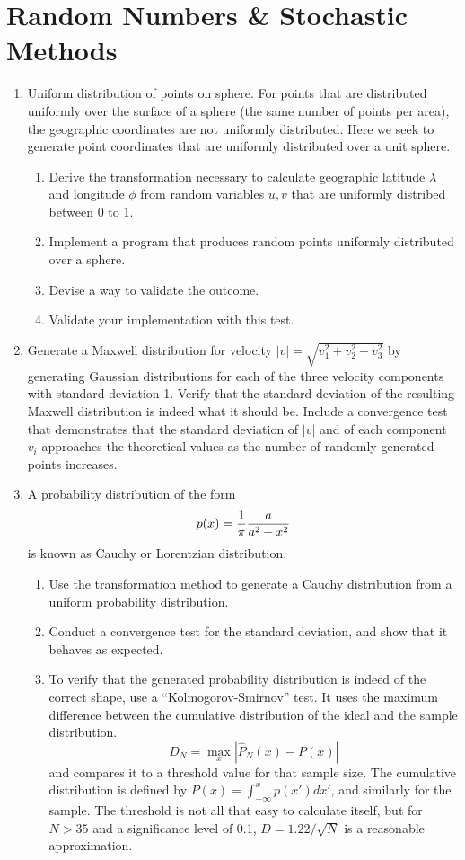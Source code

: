 \documentclass{article}
\begin{document}
\newpage
\section{Random Numbers \& Stochastic Methods}
\begin{enumerate}
\item
Uniform distribution of points on sphere.
For points that are distributed uniformly over the surface of a sphere (the same number of points per area), the geographic coordinates are not uniformly distributed. Here we seek to generate point coordinates that are uniformly distributed over a unit sphere.
\begin{enumerate} \setlength{\itemsep}{0pt}
\item Derive the transformation necessary to calculate geographic latitude $\lambda$ and longitude $\phi$ from random variables $u, v$ that are uniformly distribed between 0 to 1.
\item Implement a program that produces random points uniformly distributed over a sphere.
\item Devise a way to validate the outcome.
\item Validate your implementation with this test.
\end{enumerate}

\item
Generate a Maxwell distribution for velocity $|v|=\sqrt{v_1^2+v_2^2+v_3^2}$ by generating Gaussian distributions for each of the three velocity components with standard deviation 1. Verify that the standard deviation of the resulting Maxwell distribution is indeed what it should be. Include a convergence test that demonstrates that the standard deviation of $|v|$ and of each component $v_i$ approaches the theoretical values as the number of randomly generated points increases.


\item
  A probability distribution of the form
  \[
  p(x) = \frac{1}{\pi} {a \over a^2+x^2}
  \]
  is known as Cauchy or Lorentzian distribution.
  \begin{enumerate} \setlength{\itemsep}{0pt}
  \item Use the transformation method to generate a Cauchy distribution from a uniform probability distribution.
  \item Conduct a convergence test for the standard deviation, and show that it behaves as expected.
  \item To verify that the generated probability distribution is indeed of the correct shape, use a ``Kolmogorov-Smirnov'' test.  It uses the maximum difference between the cumulative distribution of the ideal and the sample distribution.
    \[
    D_N = \max_x |\hat P_N(x) - P(x) |
    \]
    and compares it to a threshold value for that sample size.
    The cumulative distribution is defined by $P(x)=\int_{-\infty}^x p(x') dx'$, and similarly for the sample. The threshold is not all that easy to calculate itself, but for $N>35$ and a significance level of 0.1, $D=1.22/\sqrt{N}$ is a reasonable approximation. 
  \end{enumerate}
  
\end{enumerate}
\end{document}
